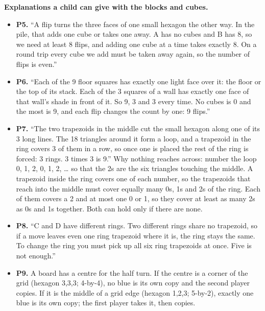 \documentclass[10pt]{article}
\begin{document}
\needspace{2in}
\textbf{Explanations a child can give with the blocks and cubes.}
\begin{itemize}
\item \textbf{P5.} ``A flip turns the three faces of one small hexagon the other way. In the pile, that adds one cube or takes one away. A has no cubes and B has 8, so we need at least 8 flips, and adding one cube at a time takes exactly 8. On a round trip every cube we add must be taken away again, so the number of flips is even.''
\item \textbf{P6.} ``Each of the 9 floor squares has exactly one light face over it: the floor or the top of its stack. Each of the 3 squares of a wall has exactly one face of that wall's shade in front of it. So 9, 3 and 3 every time. No cubes is 0 and the most is 9, and each flip changes the count by one: 9 flips.''
\item \textbf{P7.} ``The two trapezoids in the middle cut the small hexagon along one of its 3 long lines. The 18 triangles around it form a loop, and a trapezoid in the ring covers 3 of them in a row, so once one is placed the rest of the ring is forced: 3 rings. 3 times 3 is 9.'' Why nothing reaches across: number the loop 0, 1, 2, 0, 1, 2, \dots{} so that the 2s are the six triangles touching the middle. A trapezoid inside the ring covers one of each number, so the trapezoids that reach into the middle must cover equally many 0s, 1s and 2s of the ring. Each of them covers a 2 and at most one 0 or 1, so they cover at least as many 2s as 0s and 1s together. Both can hold only if there are none.
\item \textbf{P8.} ``C and D have different rings. Two different rings share no trapezoid, so if a move leaves even one ring trapezoid where it is, the ring stays the same. To change the ring you must pick up all six ring trapezoids at once. Five is not enough.''
\item \textbf{P9.} A board has a centre for the half turn. If the centre is a corner of the grid (hexagon 3,3,3; 4-by-4), no blue is its own copy and the second player copies. If it is the middle of a grid edge (hexagon 1,2,3; 5-by-2), exactly one blue is its own copy; the first player takes it, then copies.
\end{itemize}
\end{document}
